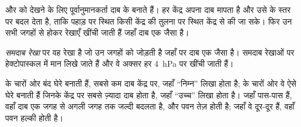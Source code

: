  और  को देखने के लिए पूर्वानुमानकर्ता दाब के  बनाते हैं। हर
केंद्र अपना दाब मापता है और उसे  के स्तर पर बदल देता है, ताकि पहाड़ पर स्थित
किसी केंद्र की तुलना  पर स्थित केंद्र से की जा सके। फिर उन सभी जगहों से होकर रेखाएँ
खींची जाती हैं जहाँ दाब एक जैसा
है।

\begin{definition}[समदाब रेखा]\label{def:g8:fronts-and-weather-maps:isobar}
\emph{समदाब रेखा}  पर वह रेखा है जो उन जगहों को जोड़ती है
जहाँ  पर दाब एक जैसा है। समदाब रेखाओं पर हेक्टोपास्कल में मान लिखे जाते हैं
और वे अक्सर हर \qty{4}{hPa} पर खींची जाती हैं।
\end{definition}

 के चारों ओर  बंद घेरे बनाती हैं, सबसे कम दाब केंद्र पर, जहाँ
``निम्न'' लिखा होता है;  के चारों ओर वे ऐसे घेरे बनाती हैं जिनके केंद्र पर
सबसे ज़्यादा दाब होता है, जहाँ ``उच्च'' लिखा होता है। जहाँ  पास-पास हैं,
वहाँ दाब एक जगह से अगली जगह तक जल्दी बदलता है, और पवन तेज़ होती है; जहाँ वे दूर-दूर
हैं, वहाँ पवन हल्की होती है।

